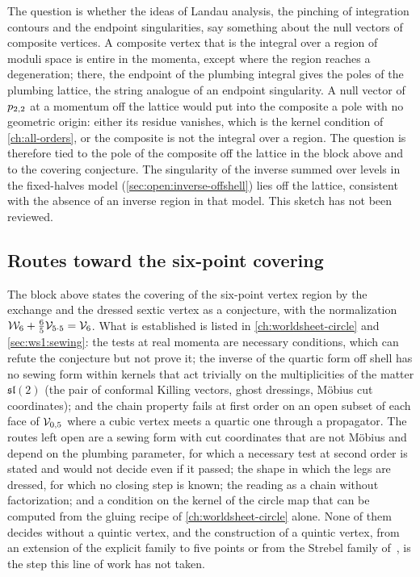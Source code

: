 The question is whether the ideas of Landau analysis, the pinching of integration contours and the endpoint singularities, say something about the null vectors of composite vertices.
A composite vertex that is the integral over a region of moduli space is entire in the momenta, except where the region reaches a degeneration; there, the endpoint of the plumbing integral gives the poles of the plumbing lattice, the string analogue of an endpoint singularity.
A null vector of $p_{2,2}$ at a momentum off the lattice would put into the composite a pole with no geometric origin: either its residue vanishes, which is the kernel condition of \cref{ch:all-orders}, or the composite is not the integral over a region.
The question is therefore tied to the pole of the composite off the lattice in the block above and to the covering conjecture.
The singularity of the inverse summed over levels in the fixed-halves model (\cref{sec:open:inverse-offshell}) lies off the lattice, consistent with the absence of an inverse region in that model.
This sketch has not been reviewed.

\subsection{Routes toward the six-point covering}
\label{sec:open:six-point}

The block above states the covering of the six-point vertex region by the exchange and the dressed sextic vertex as a conjecture, with the normalization $\mathcal{W}_{6} + \tfrac{6}{5} \mathcal{V}_{5 \cdot 5} = \mathcal{V}_{6}$.
What is established is listed in \cref{ch:worldsheet-circle} and \cref{sec:ws1:sewing}: the tests at real momenta are necessary conditions, which can refute the conjecture but not prove it; the inverse of the quartic form off shell has no sewing form within kernels that act trivially on the multiplicities of the matter $\mathfrak{sl}(2)$ (the pair of conformal Killing vectors, ghost dressings, Möbius cut coordinates); and the chain property fails at first order on an open subset of each face of ${\mathcal{V}}_{0, 5}$ where a cubic vertex meets a quartic one through a propagator.
The routes left open are a sewing form with cut coordinates that are not Möbius and depend on the plumbing parameter, for which a necessary test at second order is stated and would not decide even if it passed; the shape in which the legs are dressed, for which no closing step is known; the reading as a chain without factorization; and a condition on the kernel of the circle map that can be computed from the gluing recipe of \cref{ch:worldsheet-circle} alone.
None of them decides without a quintic vertex, and the construction of a quintic vertex, from an extension of the explicit family to five points or from the Strebel family of~\cite{Moeller:2007:ClosedBosonicString}, is the step this line of work has not taken.

